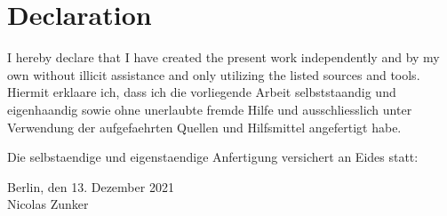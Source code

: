 
\cleardoublepage
\section*{Declaration}
I hereby declare that I have created the present work independently and by my own without illicit assistance and only utilizing the listed sources and tools.\\

Hiermit erklaare ich, dass ich die vorliegende Arbeit selbststaandig und eigenhaandig sowie ohne unerlaubte fremde Hilfe und ausschliesslich unter Verwendung der aufgefaehrten Quellen und Hilfsmittel angefertigt habe.

Die selbstaendige und eigenstaendige Anfertigung versichert an Eides statt:
\begin{center}
Berlin, den 13. Dezember 2021\\[3pc]
Nicolas Zunker
\end{center}
